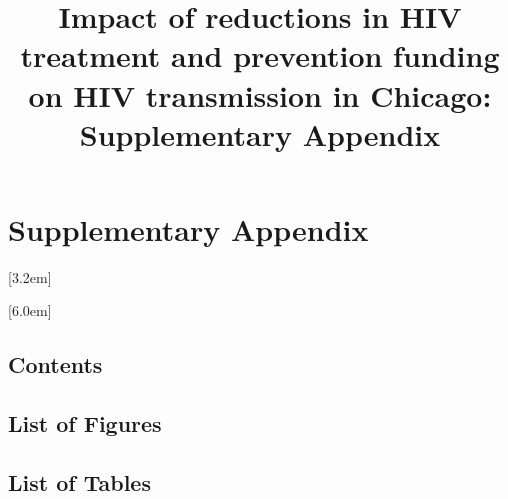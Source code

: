 \documentclass[preprint,12pt]{elsarticle}
\begin{document}
  \begin{frontmatter}
  \title{Impact of reductions in HIV treatment and prevention funding on HIV transmission in Chicago: Supplementary Appendix}
  \end{frontmatter}
\fi
\ifnum{}\relax
  \clearpage
  \section*{Supplementary Appendix}
  \label{sec:supp-appendix}
\fi

\startcontents[supp]

\contentsmargin{3.2em}
  [3.2em] %
  {}      %
  {\contentslabel{3.2em}} %
  {}      %
  {\contentspage} %

  [6.0em]
  {}
  {\contentslabel{3.8em}}
  {}
  {\contentspage}

\subsection*{Contents}

\subsection*{List of Figures}

\subsection*{List of Tables}

\clearpage

\setcounter{section}{0}
\renewcommand{\thesection}{SA.\arabic{section}}
\renewcommand{\thesubsection}{\thesection.\arabic{subsection}}
\renewcommand{\thesubsubsection}{\thesubsection.\arabic{subsubsection}}

\setcounter{figure}{0}
\setcounter{table}{0}
\renewcommand{\thefigure}{S\arabic{figure}}
\renewcommand{\thetable}{S\arabic{table}}
\end{document}
